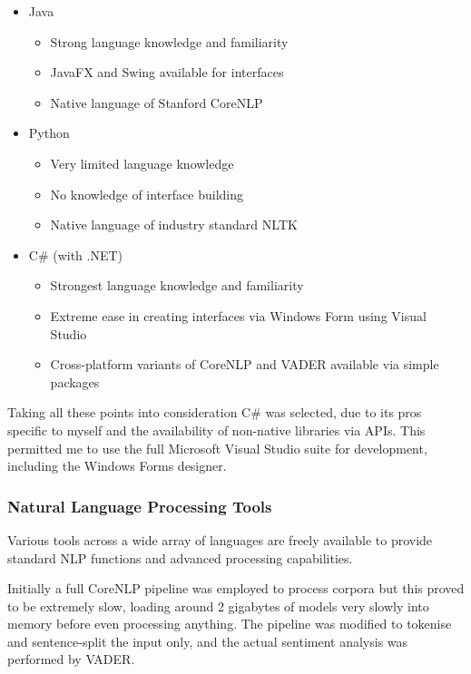 \documentclass{article}
\begin{document}
        \begin{itemize}
            \item Java
            \begin{itemize}
                \item Strong language knowledge and familiarity
                \item JavaFX and Swing available for interfaces
                \item Native language of Stanford CoreNLP
            \end{itemize}
            \item Python
            \begin{itemize}
                \item Very limited language knowledge
                \item No knowledge of interface building
                \item Native language of industry standard NLTK
            \end{itemize}
            \item C\# (with .NET)
            \begin{itemize}
                \item Strongest language knowledge and familiarity
                \item Extreme ease in creating interfaces via Windows Form using Visual Studio
                \item Cross-platform variants of CoreNLP and VADER available via simple packages
            \end{itemize}
        \end{itemize}
        Taking all these points into consideration C\# was selected, due to its pros specific to myself and the availability of non-native libraries via APIs. This permitted me to use the full Microsoft Visual Studio suite for development, including the Windows Forms designer.
        \subsubsection{Natural Language Processing Tools}
        Various tools across a wide array of languages are freely available to provide standard NLP functions and advanced processing capabilities.

        Initially a full CoreNLP pipeline was employed to process corpora but this proved to be extremely slow, loading around 2 gigabytes of models very slowly into memory before even processing anything. The pipeline was modified to tokenise and sentence-split the input only, and the actual sentiment analysis was performed by VADER.
\end{document}
